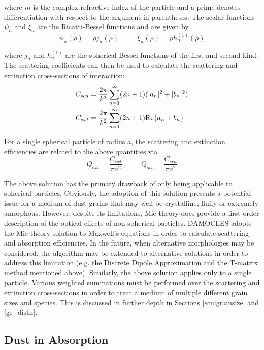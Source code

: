 \noindent where $m$ is the complex refractive index of the particle and a prime denotes differentiation with respect to the argument in parentheses. The scalar functions $\psi_n$ and $\xi_n$ are the Ricatti-Bessel functions and are given by
\begin{equation}
\psi_n(\rho) = \rho j_n(\rho) \, , \quad \quad \xi_n(\rho)=\rho h_n^{(1)}(\rho)
\end{equation}

\noindent where $j_n$ and $h_n^{(1)}$ are the spherical Bessel functions of the first and second kind.  The scattering coefficients can then be used to calculate the scattering and extinction cross-sections of interaction:
\begin{align}
C_{sca}&=\frac{2\pi}{k^2}\sum_{n=1}^{\infty} (2n+1)(|a_n|^2+|b_n|^2) \\
C_{ext}&=\frac{2\pi}{k^2}\sum_{n=1}^{\infty} (2n+1)\textnormal{Re}\{a_n+b_n\} 
\end{align}

For a single spherical particle of radius $a$, the scattering and extinction efficiencies are related to the above quantities via
\begin{equation}
Q_{ext}=\frac{C_{ext}}{\pi a^2}\, , \quad \quad Q_{sca}=\frac{C_{sca}}{\pi a^2}
\end{equation}

The above solution has the primary drawback of only being applicable to spherical particles.  Obviously, the adoption of this solution presents a potential issue for a medium of dust grains that may well be crystalline, fluffy or extremely amorphous.  However, despite its limitations, Mie theory does provide a first-order description of the optical effects of non-spherical particles.  DAMOCLES adopts the Mie theory solution to Maxwell's equations in order to calculate scattering and absorption efficiencies.  In the future, when alternative morphologies may be considered, the algorithm may be extended to alternative solutions  in order to address this limitation (e.g. the Discrete Dipole Approximation and the T-matrix method mentioned above).  Similarly, the above solution applies only to a single particle.  Various weighted summations must be performed over the scattering and extinction cross-sections in order to treat a medium of multiple different grain sizes and species.  This is discussed in further depth in Sections \ref{scn:grainsize} and \ref{gs_distn}.

\subsection{Dust in Absorption}


